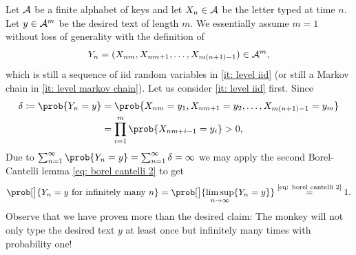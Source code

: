 \documentclass[11pt]{article}
\begin{document}
\begin{solution}
    Let \(\mathcal{A}\) be a finite alphabet of keys and let \(X_n\in
    \mathcal{A}\) be the letter typed at time \(n\). Let \(y\in \mathcal{A}^m\)
    be the desired text of length \(m\). We essentially assume \(m=1\)
    without loss of generality with the definition of
    \[
        Y_n = (X_{nm}, X_{nm+1}, \ldots, X_{m(n+1)-1}) \in \mathcal{A}^m,
    \]
    which is still a sequence of iid random variables in \ref{it: level iid}
    (or still a Markov chain in \ref{it: level markov chain}).  Let us consider \ref{it: level iid}
    first. Since
    \[\begin{aligned}
        \delta \coloneq \prob{Y_n = y}
        &= \prob{X_{nm} = y_1, X_{nm+1} = y_2, \ldots, X_{m(n+1)-1} = y_m}
        \\
        &= \prod_{i=1}^m \prob{X_{nm+i-1} = y_i} > 0,
    \end{aligned}
    \]
    Due to \(\sum_{n=1}^\infty \prob{Y_n = y} = \sum_{n=1}^\infty \delta = \infty\)
    we may apply the second Borel-Cantelli lemma \eqref{eq: borel cantelli 2} to get
    \[
        \prob[\big]{Y_n = y \text{ for infinitely many } n}
        = \prob[\big]{\limsup_{n\to\infty} \set{Y_n = y}}
        \overset{\text{\eqref{eq: borel cantelli 2}}}= 1.
    \]
    Observe that we have proven more than the desired claim: The monkey will
    not only type the desired text \(y\) at least once but infinitely many
    times with probability one!
\end{solution}
\end{document}
